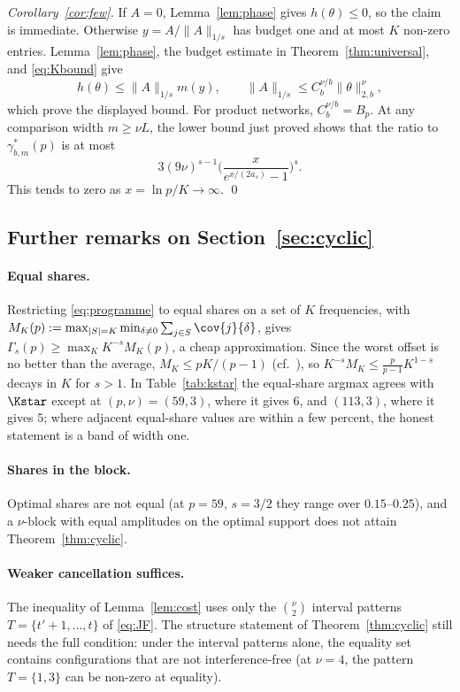 \emph{Corollary~\ref{cor:few}.} If $A=0$, Lemma~\ref{lem:phase} gives $h(\theta)\le0$, so the claim is immediate. Otherwise $y=A/\|A\|_{1/s}$ has budget one and at most $K$ non-zero entries. Lemma~\ref{lem:phase}, the budget estimate in Theorem~\ref{thm:universal}, and \eqref{eq:Kbound} give
\[
h(\theta)\le\|A\|_{1/s}m(y),\qquad
\|A\|_{1/s}\le C_b^{\nu/b}\|\theta\|_{2,b}^\nu,
\]
which prove the displayed bound. For product networks, $C_b^{\nu/b}=B_p$. At any comparison width $m\ge\nu L$, the lower bound just proved shows that the ratio to $\gamma^*_{b,m}(p)$ is at most
\[
3(9\nu)^{s-1}\Big(\frac{x}{e^{x/(2a_s)}-1}\Big)^s.
\]
This tends to zero as $x=\ln p/K\to\infty$. \qed

\subsection{Further remarks on Section~\ref{sec:cyclic}}\label{app:remarks}

\paragraph{Equal shares.} Restricting \eqref{eq:programme} to equal shares on a set of $K$ frequencies, with $M_K(p):=\max_{|S|=K}\min_{\delta\neq0}\sum_{j\in S}\cov{j}{\delta}$, gives $\Gamma_s(p)\ge\max_KK^{-s}M_K(p)$, a cheap approximation. Since the worst offset is no better than the average, $M_K\le pK/(p-1)$ (cf.\ \citealp[Thm.~2]{slepian1968group}), so $K^{-s}M_K\le\frac p{p-1}K^{1-s}$ decays in $K$ for $s>1$. In Table~\ref{tab:kstar} the equal-share argmax agrees with $\Kstar$ except at $(p,\nu)=(59,3)$, where it gives $6$, and $(113,3)$, where it gives $5$; where adjacent equal-share values are within a few percent, the honest statement is a band of width one.

\paragraph{Shares in the block.} Optimal shares are not equal (at $p=59$, $s=3/2$ they range over $0.15$--$0.25$), and a $\nu$-block with equal amplitudes on the optimal support does not attain Theorem~\ref{thm:cyclic}.

\paragraph{Weaker cancellation suffices.} The inequality of Lemma~\ref{lem:cost} uses only the $\binom\nu2$ interval patterns $T=\{t'+1,\dots,t\}$ of \eqref{eq:JF}. The structure statement of Theorem~\ref{thm:cyclic} still needs the full condition: under the interval patterns alone, the equality set contains configurations that are not interference-free (at $\nu=4$, the pattern $T=\{1,3\}$ can be non-zero at equality).

